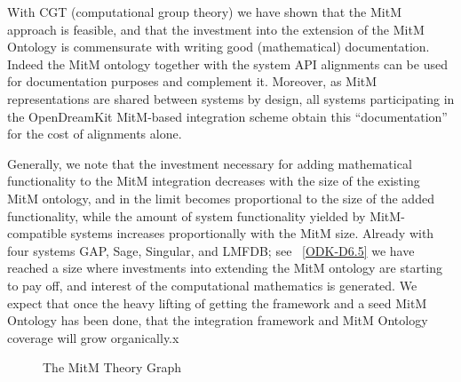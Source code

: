 \documentclass[book]{deliverablereport}
\begin{document}
With CGT (computational group theory) we have shown that the MitM approach is feasible,
and that the investment into the extension of the MitM Ontology is commensurate with
writing good (mathematical) documentation. Indeed the MitM ontology together with the
system API alignments can be used for documentation purposes and complement it. Moreover, as
MitM representations are shared between systems by design, all systems participating in
the OpenDreamKit MitM-based integration scheme obtain this ``documentation'' for the cost
of alignments alone. 

Generally, we note that the investment necessary for adding mathematical functionality to
the MitM integration decreases with the size of the existing MitM ontology, and in the
limit becomes proportional to the size of the added functionality, while the amount of
system functionality yielded by MitM-compatible systems increases proportionally with the
MitM size. Already with four systems GAP, Sage, Singular, and LMFDB; see ~\ref{ODK-D6.5}
we have reached a size where investments into extending the MitM ontology are starting to
pay off, and interest of the computational mathematics is generated. We expect that once
the heavy lifting of getting the framework and a seed MitM Ontology has been done, that
the integration framework and MitM Ontology coverage will grow organically.x

\begin{figure}\centering
  \caption{The MitM Theory Graph}\label{fig:MitM-graph}
\end{figure}
\printbibliography 
\end{document}

